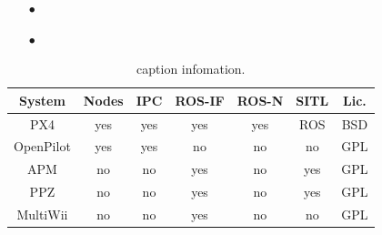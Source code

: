 \begin{itemize}
    \item[$\bullet$] \lipsum[1]
    \item[$\bullet$] \lipsum[2]
\end{itemize}
%
\begin{mdframed}
    \lipsum[1]
\end{mdframed}
%
\begin{table}[]
    \caption[]{caption infomation.}
    \label{table:example}
    \centering
    \begin{mdframed}[userdefinedwidth=0.8\textwidth,align=center]
        \begin{adjustbox}{width=1.0\textwidth}
            \begin{tabular}{@{}ccccccc@{}}
                \toprule
                \textbf{System} & \textbf{Nodes} & \textbf{IPC} & \textbf{ROS-IF} & \textbf{ROS-N} & \textbf{SITL} & \textbf{Lic.} \\ \midrule
                PX4             & yes            & yes          & yes             & yes            & ROS           & BSD           \\
                OpenPilot       & yes            & yes          & no              & no             & no            & GPL           \\
                APM             & no             & no           & yes             & no             & yes           & GPL           \\
                PPZ             & no             & no           & yes             & no             & yes           & GPL           \\
                MultiWii        & no             & no           & yes             & no             & no            & GPL           \\ \bottomrule
            \end{tabular}
        \end{adjustbox}
    \end{mdframed}
\end{table}


